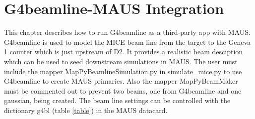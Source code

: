 


\chapter{G4beamline-MAUS Integration}

This chapter describes how to run G4beamline as a third-party app with MAUS. G4beamline is used to model the MICE beam line from the target to the Geneva 1 counter which is just upstream of D2. It provides a realistic beam desciption which can be used to seed downstream simulations in MAUS. The user must include the mapper MapPyBeamlineSimulation.py in simulate\_mice.py to use G4beamline to create MAUS primaries. Also the mapper MapPyBeamMaker must be commented out to prevent two beams, one from G4beamline and one gaussian, being created. The beam line settings can be controlled with the dictionary g4bl (table \ref{table}) in the MAUS datacard. 

